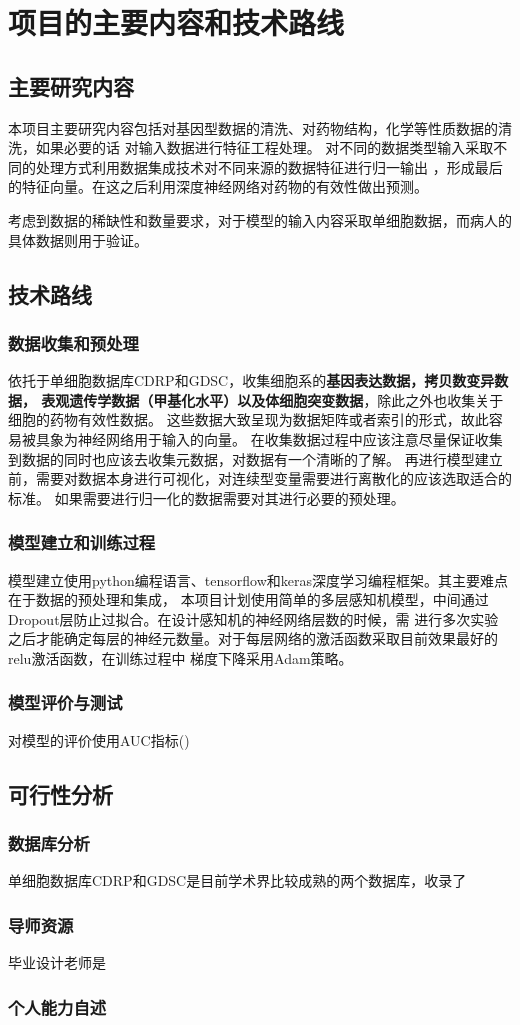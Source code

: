 \section{项目的主要内容和技术路线}

\subsection{主要研究内容}
本项目主要研究内容包括对基因型数据的清洗、对药物结构，化学等性质数据的清洗，如果必要的话
对输入数据进行特征工程处理。
对不同的数据类型输入采取不同的处理方式利用数据集成技术对不同来源的数据特征进行归一输出
，形成最后的特征向量。在这之后利用深度神经网络对药物的有效性做出预测。

考虑到数据的稀缺性和数量要求，对于模型的输入内容采取单细胞数据，而病人的具体数据则用于验证。


\subsection{技术路线}
\subsubsection{数据收集和预处理}
依托于单细胞数据库CDRP和GDSC，收集细胞系的\textbf{基因表达数据，拷贝数变异数据，
表观遗传学数据（甲基化水平）以及体细胞突变数据}，除此之外也收集关于细胞的药物有效性数据。
这些数据大致呈现为数据矩阵或者索引的形式，故此容易被具象为神经网络用于输入的向量。
在收集数据过程中应该注意尽量保证收集到数据的同时也应该去收集元数据，对数据有一个清晰的了解。
再进行模型建立前，需要对数据本身进行可视化，对连续型变量需要进行离散化的应该选取适合的标准。
如果需要进行归一化的数据需要对其进行必要的预处理。

\subsubsection{模型建立和训练过程}
模型建立使用python编程语言、tensorflow和keras深度学习编程框架。其主要难点在于数据的预处理和集成，
本项目计划使用简单的多层感知机模型，中间通过Dropout层防止过拟合。在设计感知机的神经网络层数的时候，需
进行多次实验之后才能确定每层的神经元数量。对于每层网络的激活函数采取目前效果最好的relu激活函数，在训练过程中
梯度下降采用Adam策略。

\subsubsection{模型评价与测试}
对模型的评价使用AUC指标()



\subsection{可行性分析}

\subsubsection{数据库分析}
单细胞数据库CDRP和GDSC是目前学术界比较成熟的两个数据库，收录了


\subsubsection{导师资源}
毕业设计老师是


\subsubsection{个人能力自述}
